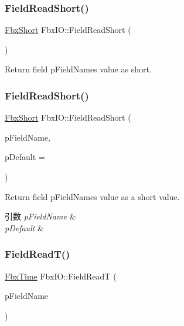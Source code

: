 \subsubsection{\texorpdfstring{Field\+Read\+Short()}{FieldReadShort()}\hspace{0.1cm}{\footnotesize\ttfamily [1/2]}}
{\footnotesize\ttfamily \hyperlink{fbxtypes_8h_a56e7a4f56baf132527df7c3cd07017b7}{Fbx\+Short} Fbx\+I\+O\+::\+Field\+Read\+Short (\begin{DoxyParamCaption}{ }\end{DoxyParamCaption})}



Return field p\+Field\+Name\textquotesingle{}s value as short. 

\mbox{\label{class_fbx_i_o_a00d2ae43978eb21adc18e1d9f6341db1}} 
\subsubsection{\texorpdfstring{Field\+Read\+Short()}{FieldReadShort()}\hspace{0.1cm}{\footnotesize\ttfamily [2/2]}}
{\footnotesize\ttfamily \hyperlink{fbxtypes_8h_a56e7a4f56baf132527df7c3cd07017b7}{Fbx\+Short} Fbx\+I\+O\+::\+Field\+Read\+Short (\begin{DoxyParamCaption}\item[{const char $\ast$}]{p\+Field\+Name,  }\item[{\hyperlink{fbxtypes_8h_a56e7a4f56baf132527df7c3cd07017b7}{Fbx\+Short}}]{p\+Default = {} }\end{DoxyParamCaption})}

Return field p\+Field\+Name\textquotesingle{}s value as a short value. 
\begin{DoxyParams}{引数}
{\em p\+Field\+Name} & \\
\hline
{\em p\+Default} & \\
\hline
\end{DoxyParams}
\mbox{\label{class_fbx_i_o_af8f95ac6ee44a53c4a97b917308d5eb2}} 
\subsubsection{\texorpdfstring{Field\+Read\+T()}{FieldReadT()}\hspace{0.1cm}{\footnotesize\ttfamily [1/2]}}
{\footnotesize\ttfamily \hyperlink{class_fbx_time}{Fbx\+Time} Fbx\+I\+O\+::\+Field\+ReadT (\begin{DoxyParamCaption}\item[{const char $\ast$}]{p\+Field\+Name }\end{DoxyParamCaption})}


